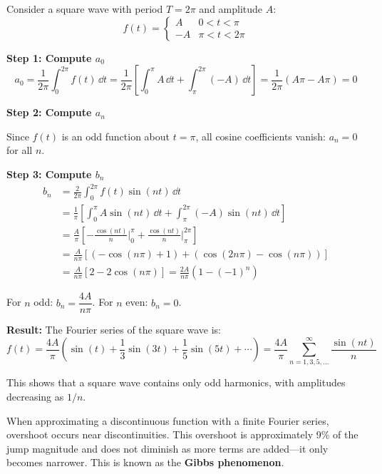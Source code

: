 \begin{examplebox}[title=Example: Fourier Series of a Square Wave]
Consider a square wave with period $T = 2\pi$ and amplitude $A$:
\[
f(t) = \begin{cases}
A & 0 < t < \pi \\
-A & \pi < t < 2\pi
\end{cases}
\]

\textbf{Step 1: Compute $a_0$}
\[
a_0 = \frac{1}{2\pi} \int_0^{2\pi} f(t) \, \dd t = \frac{1}{2\pi} \left[ \int_0^{\pi} A \, \dd t + \int_{\pi}^{2\pi} (-A) \, \dd t \right] = \frac{1}{2\pi}(A\pi - A\pi) = 0
\]

\textbf{Step 2: Compute $a_n$}

Since $f(t)$ is an odd function about $t = \pi$, all cosine coefficients vanish: $a_n = 0$ for all $n$.

\textbf{Step 3: Compute $b_n$}
\begin{align*}
b_n &= \frac{2}{2\pi} \int_0^{2\pi} f(t) \sin(nt) \, \dd t \\
&= \frac{1}{\pi} \left[ \int_0^{\pi} A\sin(nt) \, \dd t + \int_{\pi}^{2\pi} (-A)\sin(nt) \, \dd t \right] \\
&= \frac{A}{\pi} \left[ -\frac{\cos(nt)}{n} \Big|_0^{\pi} + \frac{\cos(nt)}{n} \Big|_{\pi}^{2\pi} \right] \\
&= \frac{A}{n\pi} \left[ (-\cos(n\pi) + 1) + (\cos(2n\pi) - \cos(n\pi)) \right] \\
&= \frac{A}{n\pi} \left[ 2 - 2\cos(n\pi) \right] = \frac{2A}{n\pi}(1 - (-1)^n)
\end{align*}

For $n$ odd: $b_n = \dfrac{4A}{n\pi}$. For $n$ even: $b_n = 0$.

\textbf{Result:} The Fourier series of the square wave is:
\begin{equation}
\boxed{f(t) = \frac{4A}{\pi} \left( \sin(t) + \frac{1}{3}\sin(3t) + \frac{1}{5}\sin(5t) + \cdots \right) = \frac{4A}{\pi} \sum_{n=1,3,5,\ldots}^{\infty} \frac{\sin(nt)}{n}}
\end{equation}

This shows that a square wave contains only odd harmonics, with amplitudes decreasing as $1/n$.
\end{examplebox}

\begin{keyconceptbox}[title=Gibbs Phenomenon]
When approximating a discontinuous function with a finite Fourier series, overshoot occurs near discontinuities. This overshoot is approximately 9\% of the jump magnitude and does not diminish as more terms are added---it only becomes narrower. This is known as the \textbf{Gibbs phenomenon}.
\end{keyconceptbox}

